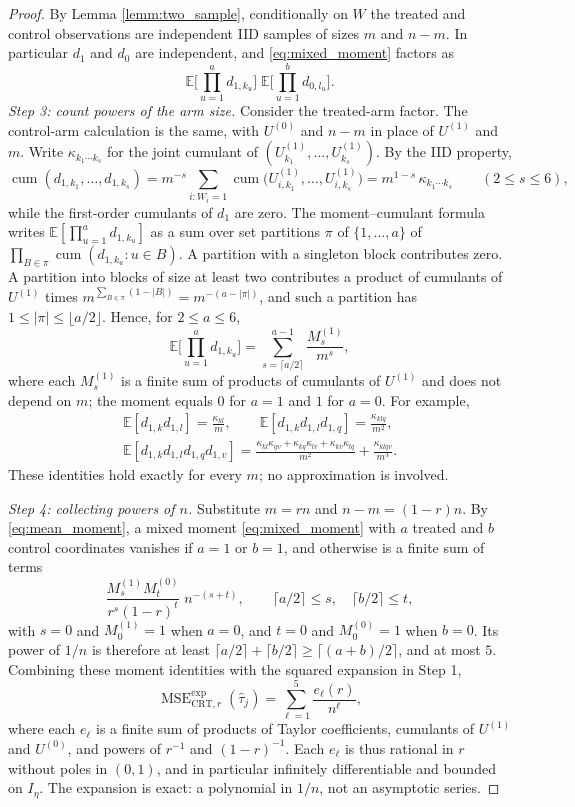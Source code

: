 \documentclass{article}
\newcommand{\EEE}{\mathbb{E}}
\newcommand{\htau}{\hat{\tau}}
\DeclareMathOperator{\MSE}{MSE}
\newcommand{\CRT}{\mathrm{CRT}}
\newcommand{\MSEexp}{\MSE^{\mathrm{exp}}}
\theoremstyle{plain}
\theoremstyle{definition}
\theoremstyle{remark}
\begin{document}
\begin{proof}
By Lemma \ref{lemm:two_sample}, conditionally on $W$ the treated and control observations are independent IID samples of sizes $m$ and $n-m$. In particular $d_1$ and $d_0$ are independent, and \eqref{eq:mixed_moment} factors as
\[
\EEE\Big[\prod_{u=1}^{a}d_{1,k_u}\Big]\;\EEE\Big[\prod_{u=1}^{b}d_{0,l_u}\Big].
\]
\emph{Step 3: count powers of the arm size.}
Consider the treated-arm factor. The control-arm calculation is the
same, with $U^{(0)}$ and $n-m$ in place of $U^{(1)}$ and $m$.
Write $\kappa_{k_1\cdots k_s}$ for the joint cumulant of $(U^{(1)}_{k_1},\ldots,U^{(1)}_{k_s})$. By the IID property,
\[
\operatorname{cum}(d_{1,k_1},\ldots,d_{1,k_s})
=m^{-s}\sum_{i:W_i=1}\operatorname{cum}\big(U^{(1)}_{i,k_1},\ldots,U^{(1)}_{i,k_s}\big)
=m^{1-s}\,\kappa_{k_1\cdots k_s}\qquad(2\le s\le6),
\]
while the first-order cumulants of $d_1$ are zero. The moment--cumulant formula writes $\EEE[\prod_{u=1}^a d_{1,k_u}]$ as a sum over set partitions $\pi$ of $\{1,\ldots,a\}$ of $\prod_{B\in\pi}\operatorname{cum}(d_{1,k_u}:u\in B)$. A partition with a singleton block contributes zero. A partition into blocks of size at least two contributes a product of cumulants of $U^{(1)}$ times $m^{\sum_{B\in\pi}(1-|B|)}=m^{-(a-|\pi|)}$, and such a partition has $1\le|\pi|\le\lfloor a/2\rfloor$. Hence, for $2\le a\le6$,
\begin{equation}
\label{eq:mean_moment}
\EEE\Big[\prod_{u=1}^{a}d_{1,k_u}\Big]=\sum_{s=\lceil a/2\rceil}^{a-1}\frac{M^{(1)}_s}{m^{s}},
\end{equation}
where each $M^{(1)}_s$ is a finite sum of products of cumulants of $U^{(1)}$ and does not depend on $m$; the moment equals $0$ for $a=1$ and $1$ for $a=0$. For example,
\[
\begin{gathered}
\EEE[d_{1,k}d_{1,l}]=\frac{\kappa_{kl}}{m},
\qquad
\EEE[d_{1,k}d_{1,l}d_{1,q}]=\frac{\kappa_{klq}}{m^2},
\\
\EEE[d_{1,k}d_{1,l}d_{1,q}d_{1,v}]=\frac{\kappa_{kl}\kappa_{qv}+\kappa_{kq}\kappa_{lv}+\kappa_{kv}\kappa_{lq}}{m^2}+\frac{\kappa_{klqv}}{m^3}.
\end{gathered}
\]
These identities hold exactly for every $m$; no approximation is involved.

\emph{Step 4: collecting powers of $n$.}
Substitute $m=rn$ and $n-m=(1-r)n$. By \eqref{eq:mean_moment}, a mixed moment \eqref{eq:mixed_moment} with $a$ treated and $b$ control coordinates vanishes if $a=1$ or $b=1$, and otherwise is a finite sum of terms
\[
\frac{M^{(1)}_sM^{(0)}_t}{r^{s}(1-r)^{t}}\;n^{-(s+t)},
\qquad
\lceil a/2\rceil\le s,\quad \lceil b/2\rceil\le t,
\]
with $s=0$ and $M^{(1)}_0=1$ when $a=0$, and $t=0$ and $M^{(0)}_0=1$ when $b=0$. Its power of $1/n$ is therefore at least $\lceil a/2\rceil+\lceil b/2\rceil\ge\lceil (a+b)/2\rceil$, and at most $5$. Combining these moment identities with the squared expansion in Step 1,
\[
\MSEexp_{\CRT,r}(\htau_j)=\sum_{\ell=1}^{5}\frac{e_\ell(r)}{n^{\ell}},
\]
where each $e_\ell$ is a finite sum of products of Taylor coefficients, cumulants of $U^{(1)}$ and $U^{(0)}$, and powers of $r^{-1}$ and $(1-r)^{-1}$. Each $e_\ell$ is thus rational in $r$ without poles in $(0,1)$, and in particular infinitely differentiable and bounded on $I_\eta$. The expansion is exact: a polynomial in $1/n$, not an asymptotic series.


\end{proof}
\end{document}
